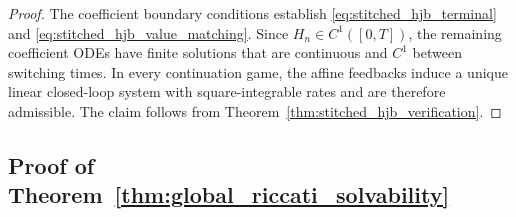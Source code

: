 \documentclass[12pt]{article}
\numberwithin{equation}{section}
\theoremstyle{definition}
\begin{document}
\begin{proof}
The coefficient boundary conditions establish
\eqref{eq:stitched_hjb_terminal} and
\eqref{eq:stitched_hjb_value_matching}. Since \(H_n\in C^1([0,T])\), the
remaining coefficient ODEs have finite solutions that are continuous and
\(C^1\) between switching times. In every continuation game, the affine
feedbacks induce a unique linear closed-loop system with square-integrable
rates and are therefore admissible. The claim follows from
Theorem~\ref{thm:stitched_hjb_verification}.
\end{proof}

\subsection{Proof of Theorem~\ref{thm:global_riccati_solvability}}
\label{subsec:proof_global_riccati_solvability}
\end{document}
